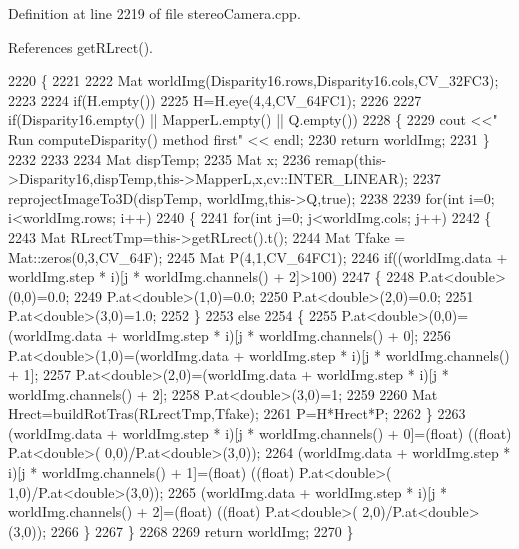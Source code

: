 Definition at line 2219 of file stereo\+Camera.\+cpp.



References get\+R\+Lrect().


\begin{DoxyCode}
2220 \{
2221 
2222     Mat worldImg(Disparity16.rows,Disparity16.cols,CV\_32FC3);
2223 
2224     \textcolor{keywordflow}{if}(H.empty())
2225         H=H.eye(4,4,CV\_64FC1);
2226 
2227     \textcolor{keywordflow}{if}(Disparity16.empty() || MapperL.empty() || Q.empty())
2228     \{
2229         cout <<\textcolor{stringliteral}{" Run computeDisparity() method first"} << endl;
2230         \textcolor{keywordflow}{return} worldImg;
2231     \}
2232 
2233 
2234     Mat dispTemp;
2235     Mat x;
2236     remap(this->Disparity16,dispTemp,this->MapperL,x,cv::INTER\_LINEAR);
2237     reprojectImageTo3D(dispTemp, worldImg,this->Q,\textcolor{keyword}{true});
2238 
2239     \textcolor{keywordflow}{for}(\textcolor{keywordtype}{int} i=0; i<worldImg.rows; i++)
2240     \{
2241         \textcolor{keywordflow}{for}(\textcolor{keywordtype}{int} j=0; j<worldImg.cols; j++)
2242         \{
2243             Mat RLrectTmp=this->getRLrect().t();
2244             Mat Tfake = Mat::zeros(0,3,CV\_64F);
2245             Mat P(4,1,CV\_64FC1);
2246             \textcolor{keywordflow}{if}((worldImg.data + worldImg.step * i)[j * worldImg.channels() + 2]>100)
2247             \{
2248                 P.at<\textcolor{keywordtype}{double}>(0,0)=0.0;
2249                 P.at<\textcolor{keywordtype}{double}>(1,0)=0.0;
2250                 P.at<\textcolor{keywordtype}{double}>(2,0)=0.0;
2251                 P.at<\textcolor{keywordtype}{double}>(3,0)=1.0;
2252             \}
2253             \textcolor{keywordflow}{else}
2254             \{
2255                 P.at<\textcolor{keywordtype}{double}>(0,0)=(worldImg.data + worldImg.step * i)[j * worldImg.channels() + 0];
2256                 P.at<\textcolor{keywordtype}{double}>(1,0)=(worldImg.data + worldImg.step * i)[j * worldImg.channels() + 1];
2257                 P.at<\textcolor{keywordtype}{double}>(2,0)=(worldImg.data + worldImg.step * i)[j * worldImg.channels() + 2];
2258                 P.at<\textcolor{keywordtype}{double}>(3,0)=1;
2259 
2260                 Mat Hrect=buildRotTras(RLrectTmp,Tfake);
2261                 P=H*Hrect*P;
2262             \}
2263             (worldImg.data + worldImg.step * i)[j * worldImg.channels() + 0]=(float) ((\textcolor{keywordtype}{float}) P.at<\textcolor{keywordtype}{double}>(
      0,0)/P.at<\textcolor{keywordtype}{double}>(3,0));
2264             (worldImg.data + worldImg.step * i)[j * worldImg.channels() + 1]=(float) ((\textcolor{keywordtype}{float}) P.at<\textcolor{keywordtype}{double}>(
      1,0)/P.at<\textcolor{keywordtype}{double}>(3,0));
2265             (worldImg.data + worldImg.step * i)[j * worldImg.channels() + 2]=(float) ((\textcolor{keywordtype}{float}) P.at<\textcolor{keywordtype}{double}>(
      2,0)/P.at<\textcolor{keywordtype}{double}>(3,0));
2266         \}
2267     \}
2268 
2269     \textcolor{keywordflow}{return} worldImg;
2270 \}
\end{DoxyCode}
\mbox{\label{classStereoCamera_a6580ff03c7cec5c385ec717f9c018e21}} 
